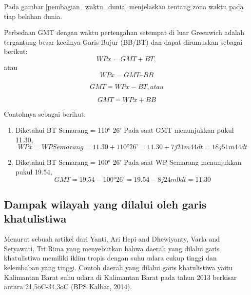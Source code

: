 Pada gambar \ref{pembagian_waktu_dunia} menjelaskan tentang zona waktu pada tiap belahan dunia.

	Perbedaan GMT dengan waktu pertengahan setempat di luar Greenwich adalah tergantung besar kecilnya Garis Bujur (BB/BT) dan dapat dirumuskan sebagai berikut:
\begin{equation}
WP x = GMT + BT, 
\end{equation}
atau 
\begin{equation}
WP x = GMT – BB
\end{equation}

\begin{equation}
GMT = WP x - BT, 
atau
\end{equation}

\begin{equation}
GMT = WP x + BB
\end{equation}

Contohnya sebagai berikut:

\begin{enumerate}
\item
Diketahui BT Semarang = 110° 26’
Pada saat GMT menunjukkan pukul 11.30, 
\begin{equation}
WP x = WP Semarang = 11.30 + 110° 26’
= 11.30 + 7 j 21m 44dt
= 18 j 51 m 44 dt
\end{equation}

\item
Diketahui BT Semarang = 100° 26’
Pada saat WP Semarang menunjukkan pukul 19.54,
\begin{equation}
GMT = 19.54 - 100° 26’
    = 19.54 - 8 j 24m 0dt
    = 11.30
\end{equation}
\end{enumerate}

\cite{khusurur2016mengenal}

\subsection{Dampak wilayah yang dilalui oleh garis khatulistiwa}

	Menurut sebuah artikel dari Yanti, Ari Hepi and Dhewiyanty, Varla and Setyawati, Tri Rima yang menyebutkan bahwa daerah yang dilalui garis khatulistiwa 
memiliki iklim tropis dengan suhu udara cukup tinggi dan kelembaban yang tinggi. Contoh daerah yang dilalui garis khatulistiwa yaitu Kalimantan Barat
suhu udara di Kalimantan Barat pada tahun 2013 berkisar antara 21,5oC-34,3oC (BPS Kalbar, 2014)\cite{yanti2015prevalensi}.

